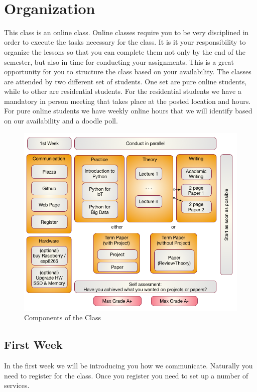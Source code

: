 \FILENAME\

\section{Organization}

This class is an online class. Online classes require you to be very
disciplined in order to execute the tasks necessary for the class. It is
it your responsibility to organize the lessons so that you can complete
them not only by the end of the semester, but also in time for
conducting your assignments. This is a great opportunity for you to
structure the class based on your availability. The classes are attended
by two different set of students. One set are pure online students,
while to other are residential students. For the residential students we
have a mandatory in person meeting that takes place at the posted
location and hours. For pure online students we have weekly online hours
that we will identify based on our availability and a doodle poll.

\begin{figure}
\centering
\includegraphics[width=\textwidth]{images/i523-overview.png}
\caption{Components of the Class}
\end{figure}


\subsection{First Week}

In the first week we will be introducing you how we communicate.
Naturally you need to register for the class. Once you register you need
to set up a number of services.

